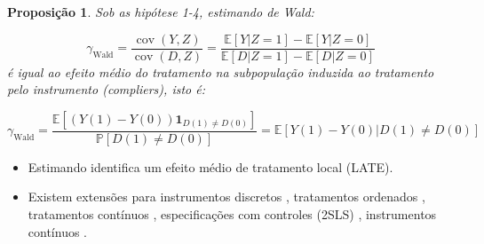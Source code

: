 \documentclass[11pt]{beamer}
\newtheorem{proposition}{Proposição}
\begin{document}
\begin{frame}{\citet{Imbens1994}}
	\begin{proposition}
		Sob as hipótese 1-4, estimando de Wald:
		
		$$\gamma_{\text{Wald}} =\frac{\operatorname{cov}(Y,Z)}{\operatorname{cov}(D,Z)} =\frac{\mathbb{E}[Y|Z=1] -\mathbb{E}[Y|Z=0]}{\mathbb{E}[D|Z=1]-\mathbb{E}[D|Z=0]}$$
		é igual ao efeito médio do tratamento na subpopulação induzida ao tratamento pelo instrumento (\textit{compliers}), isto é:
		
		$$\gamma_{\text{Wald}} =  \frac{\mathbb{E}[(Y(1)-Y(0))\mathbf{1}_{D(1)\neq D(0)}]}{\mathbb{P}[D(1)\neq D(0)]} =\mathbb{E}[Y(1)-Y(0)|D(1)\neq D(0)]$$
	\end{proposition}
	\begin{itemize}
		\item Estimando identifica um efeito médio de tratamento local (LATE).
		\item Existem extensões para instrumentos discretos \citep{Imbens1994}, tratamentos ordenados \citep{Angrist1995}, tratamentos contínuos \citet{Angrist2000}, especificações com controles (2SLS) \citep{Stoczynski2022,blandhol2022tsls}, instrumentos contínuos \citep{Alvarez2024}.
	\end{itemize}
\end{frame}
\appendix
\begin{frame}[allowframebreaks]
	\printbibliography
\end{frame}
\end{document}
